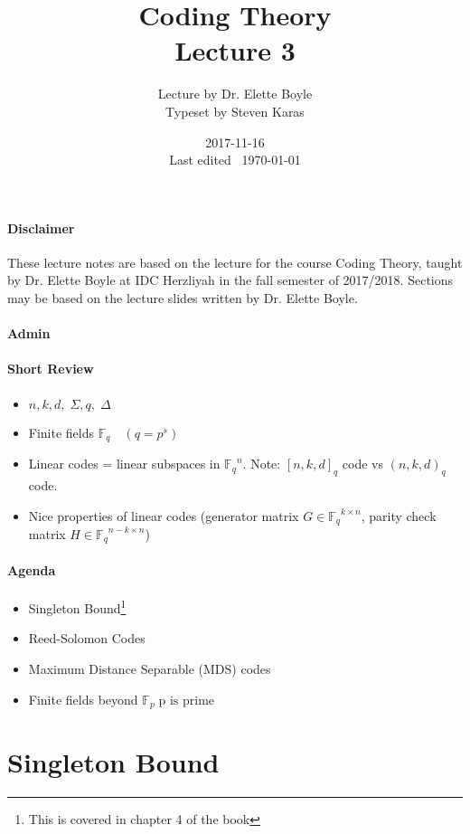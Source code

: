 \documentclass{idc_msc}
\title{Coding Theory\\\large Lecture 3}
\date{2017-11-16 \\ Last edited \currenttime\ \today}
\author{Lecture by Dr. Elette Boyle\\Typeset by Steven Karas}
\newcommand{\Fq}[1][q]{{\mathbb{F}_{#1}}}
\begin{document}
\maketitle

\paragraph{Disclaimer}

These lecture notes are based on the lecture for the course Coding Theory, taught by Dr. Elette Boyle at IDC Herzliyah in the fall semester of 2017/2018.
Sections may be based on the lecture slides written by Dr. Elette Boyle.

\paragraph{Admin}

\paragraph{Short Review}

\begin{itemize}
  \item \(n,k,d,\;\Sigma,q,\;\Delta\)
  \item Finite fields \(\Fq \quad (q=p^s)\)
  \item Linear codes = linear subspaces in \(\Fq^n\).
    Note: \([n,k,d]_q\) code vs \((n,k,d)_q\) code.
  \item Nice properties of linear codes (generator matrix \(G \in \Fq^{k \times n}\), parity check matrix \(H \in \Fq^{n-k \times n}\))
\end{itemize}

\paragraph{Agenda}

\begin{itemize}
  \item Singleton Bound\footnote{This is covered in chapter 4 of the book}
  \item Reed-Solomon Codes
  \item Maximum Distance Separable (MDS) codes
  \item Finite fields beyond \(\Fq[p]\; \text{p is prime}\)
\end{itemize}

\section{Singleton Bound}
\end{document}
